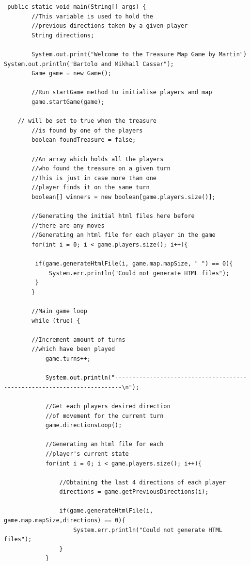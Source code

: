 \documentclass[a4paper,12pt]{extarticle}
\begin{document}
\begin{lstlisting}
 public static void main(String[] args) {
        //This variable is used to hold the 
        //previous directions taken by a given player
        String directions;

        System.out.print("Welcome to the Treasure Map Game by Martin") 		System.out.println("Bartolo and Mikhail Cassar");
        Game game = new Game();

        //Run startGame method to initialise players and map
        game.startGame(game);
        
	// will be set to true when the treasure
        //is found by one of the players
        boolean foundTreasure = false;
        
        //An array which holds all the players 
        //who found the treasure on a given turn
        //This is just in case more than one 
        //player finds it on the same turn
        boolean[] winners = new boolean[game.players.size()];

        //Generating the initial html files here before 
        //there are any moves
        //Generating an html file for each player in the game
        for(int i = 0; i < game.players.size(); i++){

         if(game.generateHtmlFile(i, game.map.mapSize, " ") == 0){
             System.err.println("Could not generate HTML files");
         }
        }

        //Main game loop
        while (true) {
        
        //Increment amount of turns 
        //which have been played        
            game.turns++;

            System.out.println("------------------------------------------------------------------------\n");

            //Get each players desired direction 
            //of movement for the current turn
            game.directionsLoop();

            //Generating an html file for each 
            //player's current state
            for(int i = 0; i < game.players.size(); i++){

                //Obtaining the last 4 directions of each player
                directions = game.getPreviousDirections(i);

                if(game.generateHtmlFile(i, game.map.mapSize,directions) == 0){
                    System.err.println("Could not generate HTML files");
                }
            }


\end{lstlisting}
\end{document}
